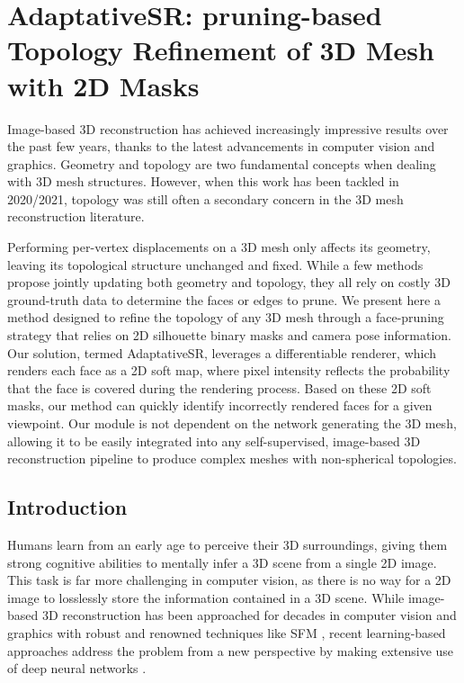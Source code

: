 \chapter{AdaptativeSR: pruning-based Topology Refinement of 3D Mesh with 2D Masks
}
\label{chapter:appendix-adaptativeSR}

{}



Image-based 3D reconstruction has achieved increasingly impressive results over the past few years, thanks to the latest advancements in computer vision and graphics. Geometry and topology are two fundamental concepts when dealing with 3D mesh structures. However, when this work has been tackled in 2020/2021, topology was still often a secondary concern in the 3D mesh reconstruction literature. 

Performing per-vertex displacements on a 3D mesh only affects its geometry, leaving its topological structure unchanged and fixed. While a few methods propose jointly updating both geometry and topology, they all rely on costly 3D ground-truth data to determine the faces or edges to prune. We present here a method designed to refine the topology of any 3D mesh through a face-pruning strategy that relies on 2D silhouette binary masks and camera pose information. Our solution, termed AdaptativeSR, leverages a differentiable renderer, which renders each face as a 2D soft map, where pixel intensity reflects the probability that the face is covered during the rendering process. Based on these 2D soft masks, our method can quickly identify incorrectly rendered faces for a given viewpoint. Our module is not dependent on the network generating the 3D mesh, allowing it to be easily integrated into any self-supervised, image-based 3D reconstruction pipeline to produce complex meshes with non-spherical topologies.

\section{Introduction}
\label{appendix:adaptativesr-intro}

Humans learn from an early age to perceive their 3D surroundings, giving them strong cognitive abilities to mentally infer a 3D scene from a single 2D image. This task is far more challenging in computer vision, as there is no way for a 2D image to losslessly store the information contained in a 3D scene. While image-based 3D reconstruction has been approached for decades in computer vision and graphics with robust and renowned techniques like \ac{SFM} \citep{longuet1981computer}, recent learning-based approaches address the problem from a new perspective by making extensive use of deep neural networks
\citep{kanazawa2018learning,deng2019accurate,saito2020pifuhd}.

